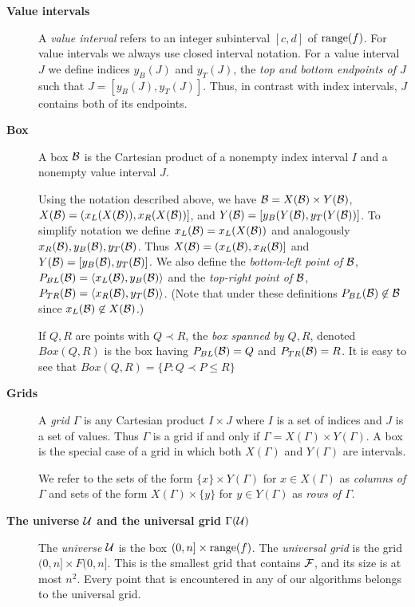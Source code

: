 \documentclass{acmsmall}
\newcommand{\cB}{{\cal B}}
\newcommand{\cF}{{\cal F}}
\newcommand{\cU}{{\cal U}}
\newcommand{\bx}{Box}
\newcommand{\point}[2]{\langle #1,#2 \rangle}
\begin{document}
\begin{description}
\item [{\bf Value intervals}]
A {\em value interval}
refers to an integer subinterval $[c,d]$ of ${\rm range}(f)$.
For value intervals we always use closed interval notation.  
For a value interval $J$ we define indices $y_B(J)$
and $y_T(J)$, the {\em top and bottom endpoints of $J$}  
such that $J=[y_B(J),y_T(J)]$.  Thus, in contrast with index intervals,
$J$ contains both of its endpoints.

\item[{\bf Box}]
A box $\cB$ is the Cartesian product of a nonempty index interval
$I$ and a nonempty value interval $J$.

Using the notation described above, we have $\cB = X(\cB) \times Y(\cB)$,
$X(\cB)=(x_L(X(\cB)),x_R(X(\cB))]$, and $Y(\cB)=[y_B(Y(\cB),y_T(Y(\cB))]$. To simplify notation we define
$x_L(\cB)=x_L(X(\cB))$ and analogously $x_R(\cB), y_B(\cB), y_T(\cB)$.
%
%
Thus $X(\cB)=(x_L(\cB),x_R(\cB)]$ and $Y(\cB)=[y_B(\cB),y_T(\cB)]$.
We also define the {\em bottom-left point of $\cB$}, 
$P_{BL}(\cB)=\point{x_L(\cB)}{y_B(\cB)}$
and the {\em top-right point of $\cB$},  $P_{TR}(\cB)=\point{x_R(\cB)}{y_T(\cB)}$.
(Note that under these definitions $P_{BL}(\cB) \not\in \cB$ since
$x_L(\cB) \not\in X(\cB)$.)

If $Q,R$ are points with $Q \prec R$, the 
{\em box spanned by $Q,R$}, denoted $\bx(Q,R)$ is the box having $P_{BL}(\cB)=Q$ and $P_{TR}(\cB)=R$.
It is easy to see that 
$\bx(Q,R)=
\{P:Q \prec P \leq R\}$

\item[{\bf Grids}]
A {\em grid} $\Gamma$ is any Cartesian product $I \times J$ where
$I$ is a set of indices and $J$ is a set of values.  Thus 
$\Gamma$ is a grid if and only if $\Gamma = X(\Gamma) \times Y(\Gamma)$.
A box is the special case of a grid in which both $X(\Gamma)$
and $Y(\Gamma)$ are intervals.  

We refer to the sets of the form $\{x\} \times Y(\Gamma)$ for $x \in X(\Gamma)$ as
{\em columns of $\Gamma$} and sets of the form $X(\Gamma) \times \{y\}$ for $y \in Y(\Gamma)$
as {\em rows of $\Gamma$}.  

\item[{\bf The universe $\cU$ and the universal grid $\Gamma(\cU)$}]  The {\em universe $\cU$}  is  the box $(0,n] \times {\rm range}(f)$.
The {\em universal grid} is the grid $(0,n] \times F(0,n]$.  This is the smallest grid that contains $\cF$, and its
size is at most $n^2$.  Every point that is encountered in any of our algorithms belongs to the universal grid.


\end{description}
\end{document}
